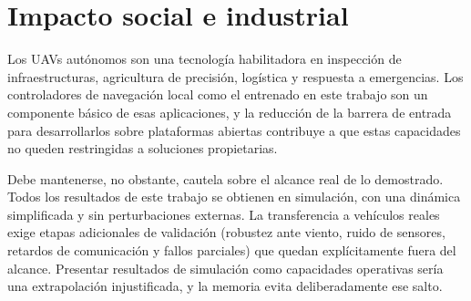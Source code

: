 \section{Impacto social e industrial} \label{sct:impacto:social}

Los UAVs autónomos son una tecnología habilitadora en inspección de
infraestructuras, agricultura de precisión, logística y respuesta a emergencias.
Los controladores de navegación local como el entrenado en este trabajo son un
componente básico de esas aplicaciones, y la reducción de la barrera de entrada
para desarrollarlos sobre plataformas abiertas contribuye a que estas
capacidades no queden restringidas a soluciones propietarias.

Debe mantenerse, no obstante, cautela sobre el alcance real de lo demostrado.
Todos los resultados de este trabajo se obtienen en simulación, con una dinámica
simplificada y sin perturbaciones externas. La transferencia a vehículos reales
exige etapas adicionales de validación (robustez ante viento, ruido de sensores,
retardos de comunicación y fallos parciales) que quedan explícitamente fuera del
alcance. Presentar resultados de simulación como capacidades operativas sería
una extrapolación injustificada, y la memoria evita deliberadamente ese salto.



